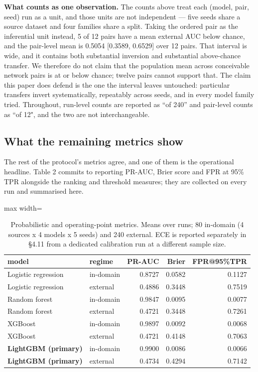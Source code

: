 \documentclass[preprint,12pt,nopreprintline]{elsarticle}
\begin{document}
\textbf{What counts as one observation.} The counts above treat each (model, pair, seed) run as a unit, and those units are not independent --- five seeds share a source dataset and four families share a split. Taking the ordered pair as the inferential unit instead, 5 of 12 pairs have a mean external AUC below chance, and the pair-level mean is 0.5054 [0.3589, 0.6529] over 12 pairs. That interval is wide, and it contains both substantial inversion and substantial above-chance transfer. We therefore do not claim that the population mean across conceivable network pairs is at or below chance; twelve pairs cannot support that. The claim this paper does defend is the one the interval leaves untouched: particular transfers invert systematically, repeatably across seeds, and in every model family tried. Throughout, run-level counts are reported as ``of 240'' and pair-level counts as ``of 12", and the two are not interchangeable.

\subsection{What the remaining metrics show}

The rest of the protocol's metrics agree, and one of them is the operational headline. Table 2 commits to reporting PR-AUC, Brier score and FPR at 95\% TPR alongside the ranking and threshold measures; they are collected on every run and summarised here.

\begin{table}[htbp]\centering\scriptsize
\caption{Probabilistic and operating-point metrics. Means over runs; 80 in-domain (4 sources x 4 models x 5 seeds) and 240 external. ECE is reported separately in \S{}4.11 from a dedicated calibration run at a different sample size.}
\begin{adjustbox}{max width=\textwidth}\begin{tabular}{llrrr}
\toprule
model & regime & PR-AUC & Brier & FPR@95\%TPR \\
\midrule
Logistic regression & in-domain & 0.8727 & 0.0582 & 0.1127 \\
Logistic regression & external & 0.4886 & 0.3448 & 0.7519 \\
Random forest & in-domain & 0.9847 & 0.0095 & 0.0077 \\
Random forest & external & 0.4721 & 0.3448 & 0.7261 \\
XGBoost & in-domain & 0.9897 & 0.0092 & 0.0068 \\
XGBoost & external & 0.4721 & 0.4148 & 0.7063 \\
\textbf{LightGBM (primary)} & in-domain & 0.9900 & 0.0086 & 0.0066 \\
\textbf{LightGBM (primary)} & external & 0.4734 & 0.4294 & 0.7142 \\
\bottomrule
\end{tabular}\end{adjustbox}
\end{table}
\end{document}
